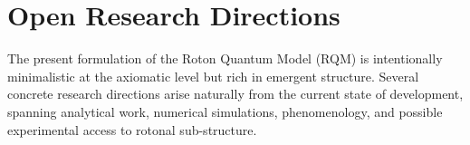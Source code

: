 \documentclass[11pt,a4paper]{article}
\begin{document}










\section{Open Research Directions}

The present formulation of the Roton Quantum Model (RQM) is intentionally minimalistic at the axiomatic level but rich in emergent structure. 
Several concrete research directions arise naturally from the current state of development, spanning analytical work, numerical simulations, phenomenology, and possible experimental access to rotonal sub-structure.
\end{document}
